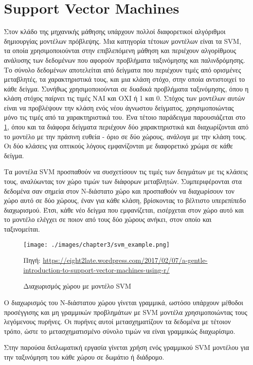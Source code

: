 \section{Support Vector Machines}
\label{section:svm}

Στον κλάδο της μηχανικής μάθησης υπάρχουν πολλοί διαφορετικοί αλγόριθμοι δημιουργίας μοντέλων πρόβλεψης. Μια κατηγορία τέτοιων μοντέλων είναι τα SVM, τα οποία χρησιμοποιούνται στην επιβλεπόμενη μάθηση και περιέχουν αλγορίθμους ανάλυσης των δεδομένων που αφορούν προβλήματα ταξινόμησης και παλινδρόμησης. Το σύνολο δεδομένων αποτελείται από δείγματα που περιέχουν τιμές από ορισμένες μεταβλητές, τα χαρακτηριστικά τους, και μια κλάση στόχο, στην οποία αντιστοιχεί το κάθε δείγμα. Συνήθως χρησιμοποιούνται σε δυαδικά προβλήματα ταξινόμησης, όπου η κλάση στόχος παίρνει τις τιμές ΝΑΙ και ΟΧΙ ή 1 και 0. Στόχος των μοντέλων αυτών είναι να προβλέψουν την κλάση ενός νέου άγνωστου δείγματος, χρησιμοποιώντας μόνο τις τιμές από τα χαρακτηριστικά του. Ένα τέτοιο παράδειγμα παρουσιάζεται στο \ref{fig:svm_example}, όπου και τα διάφορα δείγματα περιέχουν δύο χαρακτηριστικά και διαχωρίζονται από το μοντέλο με την πράσινη ευθεία - όριο σε δύο χώρους, ανάλογα με την κλάση τους. Οι δύο κλάσεις για οπτικούς λόγους εμφανίζονται με διαφορετικό χρώμα σε κάθε δείγμα.

Τα μοντέλα SVM προσπαθούν να συσχετίσουν τις τιμές των δειγμάτων με τις κλάσεις τους, αναλύωντας τον χώρο τιμών των διάφορων μεταβλητών. Συμπεριφέρονται στα δεδομένα σαν σημεία στον Ν-διάστατο χώρο και προσπαθούν να διαχωρίσουν τον χώρο αυτό σε δύο χώρους, έναν για κάθε κλάση, βρίσκοντας το βέλτιστο υπερεπίπεδο διαχωρισμού. Έτσι, κάθε νέο δείγμα που εμφανίζεται, εισέρχεται στον χώρο αυτό και το μοντέλο ελέγχει σε ποιον από τους δύο χώρους ανήκει, στον οποίο και ταξινομείται.


\begin{figure}
    \centering
    \texttt{[image: ./images/chapter3/svm\_example.png]}
    \caption{Διαχωρισμός χώρου με μοντέλο SVM}
    Πηγή: \href{https://eight2late.wordpress.com/2017/02/07/a-gentle-introduction-to-support-vector-machines-using-r/}{https://eight2late.wordpress.com/2017/02/07/a-gentle-introduction-to-support-vector-machines-using-r/}
    \label{fig:svm_example}
\end{figure}

Ο διαχωρισμός του Ν-διάστατου χώρου γίνεται γραμμικά, ωστόσο υπάρχουν μέθοδοι προσέγγισης και μη γραμμικών προβλημάτων με SVM μοντέλα χρησιμοποιώντας τους λεγόμενους πυρήνες. Οι πυρήνες αυτοί μετασχηματίζουν τα δεδομένα με τέτοιον τρόπο, ώστε το μετασχηματισμένο σύνολο τιμών να είναι γραμμικώς διαχωρίσιμο.

Στην παρούσα διπλωματική εργασία γίνεται χρήση ενός γραμμικού SVM μοντέλου για την ταξινόμηση του κάθε χώρου σε δωμάτιο ή διάδρομο.

